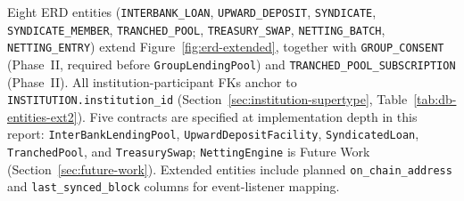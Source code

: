 \documentclass[12pt,a4paper]{report}
\begin{document}
Eight ERD entities (\texttt{INTERBANK\_LOAN}, \texttt{UPWARD\_DEPOSIT}, \texttt{SYNDICATE}, \texttt{SYNDICATE\_MEMBER}, \texttt{TRANCHED\_POOL}, \texttt{TREASURY\_SWAP}, \texttt{NETTING\_BATCH}, \texttt{NETTING\_ENTRY}) extend Figure~\ref{fig:erd-extended}, together with \texttt{GROUP\_CONSENT} (Phase~II, required before \texttt{GroupLendingPool}) and \texttt{TRANCHED\_POOL\_SUBSCRIPTION} (Phase~II). All institution-participant FKs anchor to \texttt{INSTITUTION.institution\_id} (Section~\ref{sec:institution-supertype}, Table~\ref{tab:db-entities-ext2}). Five contracts are specified at implementation depth in this report: \texttt{InterBankLendingPool}, \texttt{UpwardDepositFacility}, \texttt{SyndicatedLoan}, \texttt{TranchedPool}, and \texttt{TreasurySwap}; \texttt{NettingEngine} is Future Work (Section~\ref{sec:future-work}). Extended entities include planned \texttt{on\_chain\_address} and \texttt{last\_synced\_block} columns for event-listener mapping.
\end{document}
